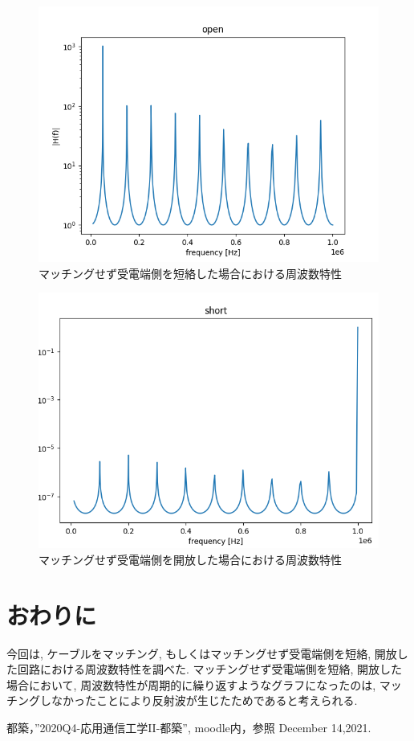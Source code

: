 \documentclass[a4j,12pt,]{jarticle}
\begin{document}
\begin{figure}[H]
  \begin{center}
    \includegraphics[width=160mm]{open.png}
    \caption{マッチングせず受電端側を短絡した場合における周波数特性}
    \label{p3}
  \end{center}
\end{figure}

\begin{figure}[H]
  \begin{center}
    \includegraphics[width=160mm]{short.png}
    \caption{マッチングせず受電端側を開放した場合における周波数特性}
    \label{p4}
  \end{center}
\end{figure}

\section{おわりに}

今回は, ケーブルをマッチング, もしくはマッチングせず受電端側を短絡, 開放した回路における周波数特性を調べた.
マッチングせず受電端側を短絡, 開放した場合において, 周波数特性が周期的に繰り返すようなグラフになったのは, マッチングしなかったことにより反射波が生じたためであると考えられる.

\begin{thebibliography}{5}
  都築，”2020Q4-応用通信工学II-都築”, moodle内，参照 December 14,2021.
\end{thebibliography}
\end{document}
